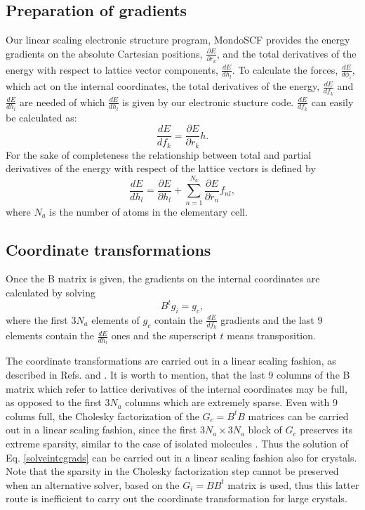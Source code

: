 \documentclass[prl,aps,preprint,superbib,12pt]{revtex4}
\begin{document}
\subsection{Preparation of gradients}
Our linear scaling electronic structure program, MondoSCF \cite{MondoSCF} provides
the energy gradients on the absolute Cartesian positions, 
$\frac{\partial E}{\partial r_{k}}$, and the total derivatives
of the energy with respect to lattice vector components, 
$\frac{d E}{d h_{l}}$.
To calculate the forces, $\frac{d E}{d \phi_{i}}$, which act on the
internal coordinates, the total derivatives of the energy,
$\frac{d E}{d f_{k}}$ and 
$\frac{d E}{d h_{l}}$ are needed of which $\frac{d E}{d h_{l}}$ is 
given by our electronic stucture code.
$\frac{d E}{d f_{k}}$ can easily be calculated as:
\begin{equation}
\frac{d E}{d f_{k}} = \frac{\partial E}{\partial r_{k}} h .
\end{equation}
For the sake of completeness the relationship between total and
partial derivatives of the energy with respect of the lattice vectors
is defined by    
\begin{equation}
\frac{d E}{d h_{l}} = \frac{\partial E}{\partial h_{l}} +
                      \sum_{n=1}^{N_{a}} 
                      \frac{\partial E}{\partial r_{n}} f_{nl} ,
\end{equation}
where $N_{a}$ is the number of atoms in the elementary cell.



\subsection{Coordinate transformations}
Once the B matrix is given, the gradients on the internal coordinates
are calculated by solving 
\begin{equation} \label{solveintcgrads}
B^{t} g_{i} = g_{c} ,
\end{equation}
where the first $3N_{a}$ elements of $g_{c}$ contain 
the $\frac{d E}{d f_{k}}$ gradients and the last $9$ elements contain
the $\frac{d E}{d h_{l}}$ ones and the superscript $t$ means 
transposition.

The coordinate transformations are carried out in a linear scaling 
fashion, as described in Refs.  and 
. It is worth to mention, that the last 9 columns
of the B matrix which refer to lattice derivatives of the internal 
coordinates may be full, as opposed to the first $3N_{a}$ columns 
which are extremely sparse. Even with 9 colums full, the Cholesky
factorization of the $G_{c}=B^{t}B$ matrices can be carried out
in a linear scaling fashion, since the first $3N_{a} \times 3N_{a}$
block of $G_{c}$ preserves its extreme sparsity, similar to the
case of isolated molecules \cite{KNemeth00}.
Thus the solution of Eq. \ref{solveintcgrads} can be carried out 
in a linear scaling fashion also for crystals.
Note that the sparsity in the Cholesky factorization step cannot be
preserved when an alternative solver, based on the $G_{i}=BB^{t}$
matrix is used, thus this latter route is inefficient to carry out
the coordinate transformation for large crystals.
\end{document}
